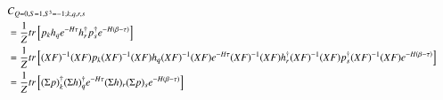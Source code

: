 \begin{equation}
  \resizebox{\textwidth}{!}{%
  $
  \begin{aligned}
    &C_{Q=0,S=1,S^3=-1;k,q,r,s}\\ 
    &= \frac{1}{Z}tr\left[p_kh_qe^{-H\tau}h^\dagger_rp^\dagger_se^{-H\left(\beta-\tau\right)}\right] \\
    &= \frac{1}{Z}tr\left[(XF)^{-1}(XF)p_k(XF)^{-1}(XF)h_q(XF)^{-1}(XF)e^{-H\tau}(XF)^{-1}(XF)h^\dagger_r(XF)^{-1}(XF)p^\dagger_s(XF)^{-1}(XF)e^{-H\left(\beta-\tau\right)}\right] \\
    &= \frac{1}{Z}tr\left[(\Sigma p)^\dagger_k(\Sigma h)^\dagger_qe^{-H\tau}(\Sigma h)_r(\Sigma p)_se^{-H\left(\beta-\tau\right)}\right]
  \end{aligned}$}
\end{equation}

\renewcommand{\cor}[4]{p_{#1}h_{#2}h^\dagger_{#3}p^\dagger_{#4}}
\renewcommand{\dscor}[4]{\left(\Sigma p\right)_{#1}^\dagger \left(\Sigma h\right)_{#2}^\dagger \left(\Sigma h\right)_{#3}\left(\Sigma p\right)_{#4}}
\renewcommand{\dcor}[4]{p_{#1}^\dagger h_{#2}^\dagger h_{#3} p_{#4}}

